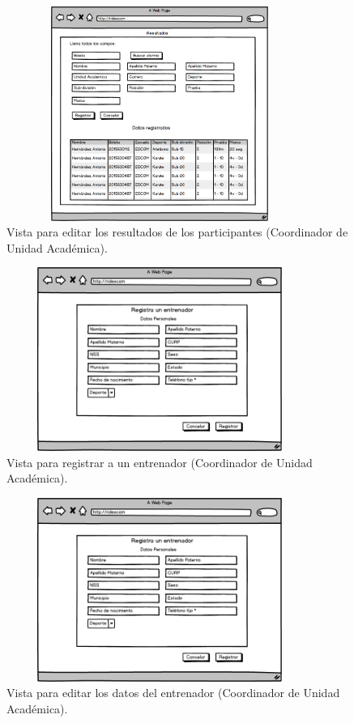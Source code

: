 		\begin{figure} [hbt!]
			\centering
			\includegraphics[width=10cm, height=7cm]{Imagenes/Nuevos/P11_Editar_resultados}
			\caption{Vista para editar los resultados de los participantes (Coordinador de Unidad Académica).}
			\label{editaresultados}
		\end{figure}
		\pagebreak
		
		\begin{figure} [hbt!]
			\centering
			\includegraphics[width=10cm, height=6cm]{Imagenes/Nuevos/P12_Registro_entrenador}
			\caption{Vista para registrar a un entrenador (Coordinador de Unidad Académica).}
			\label{registroentrenador}
		\end{figure}
		
		\begin{figure} [hbt!]
			\centering
			\includegraphics[width=10cm, height=6cm]{Imagenes/Nuevos/P13_Editar_entrenador}
			\caption{Vista para editar los datos del entrenador (Coordinador de Unidad Académica).}
			\label{editarentrenador}
		\end{figure}
		
